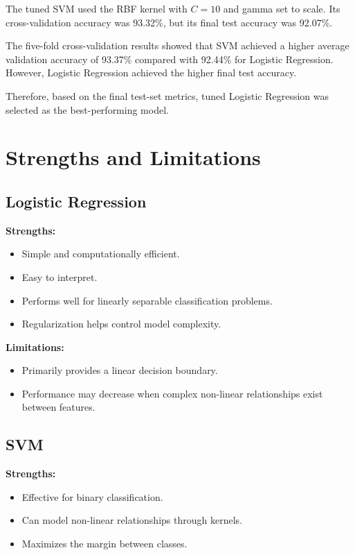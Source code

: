 \documentclass[12pt,a4paper]{article}
\begin{document}
The tuned SVM used the RBF kernel with $C=10$ and gamma set to scale.
Its cross-validation accuracy was 93.32\%, but its final test accuracy
was 92.07\%.

The five-fold cross-validation results showed that SVM achieved a
higher average validation accuracy of 93.37\% compared with 92.44\%
for Logistic Regression. However, Logistic Regression achieved the
higher final test accuracy.

Therefore, based on the final test-set metrics, tuned Logistic
Regression was selected as the best-performing model.


\section{Strengths and Limitations}

\subsection{Logistic Regression}

\textbf{Strengths:}

\begin{itemize}
    \item Simple and computationally efficient.
    \item Easy to interpret.
    \item Performs well for linearly separable classification problems.
    \item Regularization helps control model complexity.
\end{itemize}

\textbf{Limitations:}

\begin{itemize}
    \item Primarily provides a linear decision boundary.
    \item Performance may decrease when complex non-linear relationships
    exist between features.
\end{itemize}

\subsection{SVM}

\textbf{Strengths:}

\begin{itemize}
    \item Effective for binary classification.
    \item Can model non-linear relationships through kernels.
    \item Maximizes the margin between classes.
\end{itemize}
\end{document}
